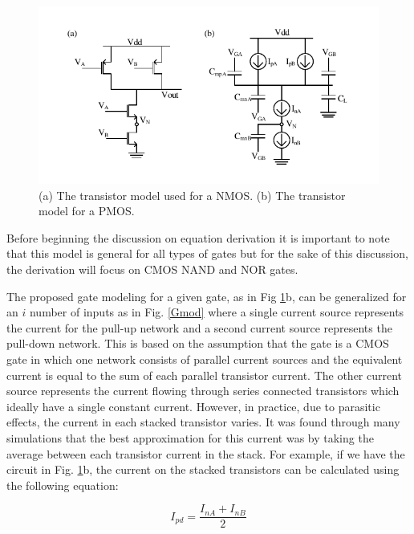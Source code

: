 \begin{figure}[!htbp]
	\centering
	\includegraphics[width=0.85\linewidth]{Figures/Conv_Mod}
	\caption{(a) The transistor model used for a NMOS. (b) The transistor model for a PMOS.}
	\label{Convert}
\end{figure}

Before beginning the discussion on equation derivation it is important to note that this model is general for all types of gates but for the sake of this discussion, the derivation will focus on CMOS NAND and NOR gates.  

The proposed gate modeling for a given gate, as in Fig \ref{Convert}b, can be generalized for an $i$ number of inputs as in Fig. \ref{Gmod} where a single current source represents the current for the pull-up network and a second current source represents the pull-down network. This is based on the assumption that the gate is a CMOS gate in which one network consists of parallel current sources and the equivalent current is equal to the sum of each parallel transistor current. The other current source represents the current flowing through series connected transistors which ideally have a single constant current. However, in practice, due to parasitic effects, the current in each stacked transistor varies. It was found through many simulations that the best approximation for this current was by taking the average between each transistor current in the stack. For example, if we have the circuit in Fig. \ref{Convert}b, the current on the stacked transistors can be calculated using the following equation:

\begin{equation}\label{pdeq}
I_{pd} = \frac{I_{nA}+I_{nB}}{2}
\end{equation}

